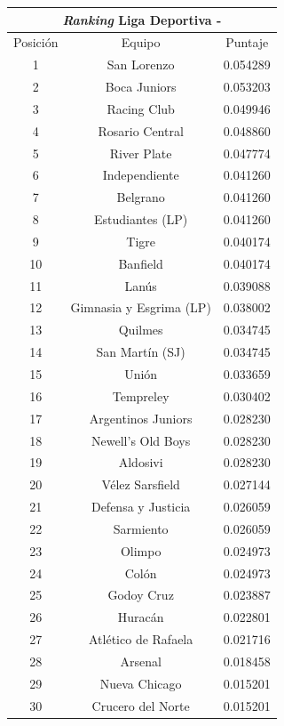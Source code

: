 \begin{center}
\begin{tabular}{|c|c|c|}
	      			\end{tabular} 
	      			    \begin{tabular}{|c|c|c|} 
			      		\hline
			  				\multicolumn{3}{c}{\emph{Ranking} Liga Deportiva - \acr{AFA}} \\
			 			\hline
	        			Posición & Equipo & Puntaje \\ \hline
						    1 & San Lorenzo & 0.054289 \\
						    2 & Boca Juniors & 0.053203 \\
						    3 & Racing Club & 0.049946 \\
						    4 & Rosario Central & 0.048860 \\
						    5 & River Plate & 0.047774 \\
						    6 & Independiente & 0.041260 \\
						    7 & Belgrano & 0.041260 \\
						    8 & Estudiantes (LP) & 0.041260 \\
						    9 & Tigre & 0.040174 \\
						   10 & Banfield & 0.040174 \\
						   11 & Lanús & 0.039088 \\
						   12 & Gimnasia y Esgrima (LP) & 0.038002 \\
						   13 & Quilmes & 0.034745 \\
						   14 & San Martín (SJ) & 0.034745 \\
						   15 & Unión & 0.033659 \\
						   16 & Tempreley & 0.030402 \\
						   17 & Argentinos Juniors & 0.028230 \\
						   18 & Newell's Old Boys & 0.028230 \\
						   19 & Aldosivi & 0.028230 \\
						   20 & Vélez Sarsfield & 0.027144 \\
						   21 & Defensa y Justicia & 0.026059 \\
						   22 & Sarmiento & 0.026059 \\
						   23 & Olimpo & 0.024973 \\
						   24 & Colón & 0.024973 \\
						   25 & Godoy Cruz & 0.023887 \\
						   26 & Huracán & 0.022801 \\
						   27 & Atlético de Rafaela & 0.021716 \\
						   28 & Arsenal & 0.018458 \\
						   29 & Nueva Chicago & 0.015201 \\
						   30 & Crucero del Norte & 0.015201 \\

	      			\end{tabular} 
	      	\end{center}


